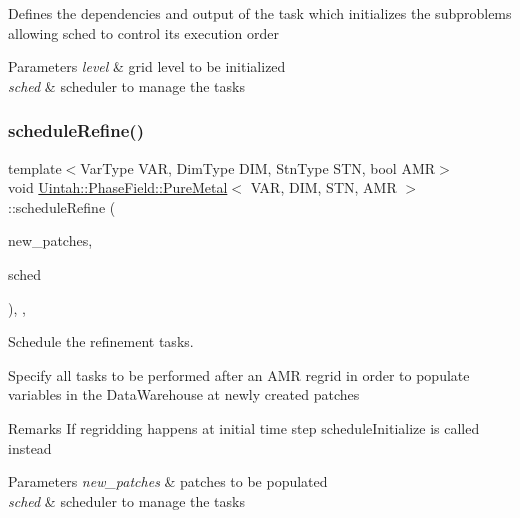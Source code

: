 Defines the dependencies and output of the task which initializes the subproblems allowing sched to control its execution order


\begin{DoxyParams}{Parameters}
{\em level} & grid level to be initialized \\
\hline
{\em sched} & scheduler to manage the tasks \\
\hline
\end{DoxyParams}
\mbox{\label{classUintah_1_1PhaseField_1_1PureMetal_adac60105aa32fa2d78a379e4fadb0f6d}} 
\subsubsection{\texorpdfstring{schedule\+Refine()}{scheduleRefine()}}
{\footnotesize\ttfamily template$<$Var\+Type V\+AR, Dim\+Type D\+IM, Stn\+Type S\+TN, bool A\+MR$>$ \\
void \hyperlink{classUintah_1_1PhaseField_1_1PureMetal}{Uintah\+::\+Phase\+Field\+::\+Pure\+Metal}$<$ V\+AR, D\+IM, S\+TN, A\+MR $>$\+::schedule\+Refine (\begin{DoxyParamCaption}\item[{const Patch\+Set $\ast$}]{new\+\_\+patches,  }\item[{SchedulerP \&}]{sched }\end{DoxyParamCaption})\hspace{0.3cm}{\ttfamily [override]}, {\ttfamily [protected]}, {\ttfamily [virtual]}}



Schedule the refinement tasks. 

Specify all tasks to be performed after an A\+MR regrid in order to populate variables in the Data\+Warehouse at newly created patches

\begin{DoxyRemark}{Remarks}
If regridding happens at initial time step schedule\+Initialize is called instead
\end{DoxyRemark}

\begin{DoxyParams}{Parameters}
{\em new\+\_\+patches} & patches to be populated \\
\hline
{\em sched} & scheduler to manage the tasks \\
\hline
\end{DoxyParams}
\mbox{\label{classUintah_1_1PhaseField_1_1PureMetal_ac72766b53d2bda11d81ea361638d6408}} 
